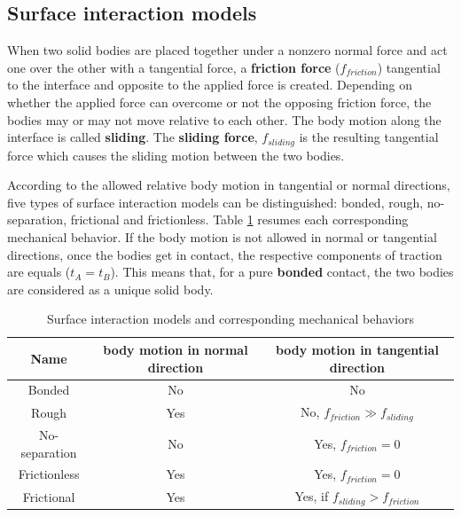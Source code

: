 \subsection{Surface interaction models}%

\label{subsection:surfaceinteractionmodels}
When two solid bodies are placed together under a nonzero normal force and act one over the other with a tangential force, a \textbf{friction force} ($f_{friction}$) tangential to the interface and opposite to the applied force is created. Depending on whether the applied force can overcome  or not the opposing friction force, the bodies may or may not move relative to each other. The body motion along the interface is called \textbf{sliding}. The \textbf{sliding force}, $f_{sliding}$ is the resulting tangential force which causes the sliding motion between the two bodies.
  
According to the allowed relative body motion in tangential or normal directions, five types of surface interaction models can be distinguished: bonded, rough, no-separation, frictional and frictionless. Table \ref{contactB} resumes each corresponding mechanical behavior. If the body motion is not allowed in normal or tangential directions, once the bodies get in contact, the respective components of traction are equals ($t_A=t_B$). This means that, for a pure \textbf{bonded} contact, the two bodies are considered as a unique solid body.    

\begin{table}[H]

\begin{center}
\begin{tabular}{||c|c|c||}
\hline
Name & body motion in normal direction & body motion in tangential direction \\
\hline\hline
Bonded & No & No\\
\hline
Rough & Yes & No, $f_{friction} \gg f_{sliding}$ \\
\hline
No-separation & No & Yes, $f_{friction} = 0$ \\
\hline
Frictionless & Yes & Yes, $f_{friction} = 0$ \\
\hline
Frictional & Yes & Yes, if $f_{sliding} > f_{friction}$\\
\hline
\end{tabular}
\caption{Surface interaction models and corresponding mechanical behaviors}
\label{contactB}
\end{center}
\end{table}

